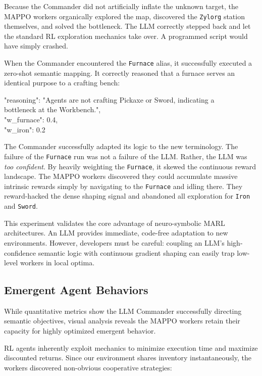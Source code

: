 Because the Commander did not artificially inflate the unknown target, the MAPPO workers organically explored the map, discovered the \texttt{Zylorg} station themselves, and solved the bottleneck. The LLM correctly stepped back and let the standard RL exploration mechanics take over. A programmed script would have simply crashed. 

When the Commander encountered the \texttt{Furnace} alias, it successfully executed a zero-shot semantic mapping. It correctly reasoned that a furnace serves an identical purpose to a crafting bench:
 
 \begin{hegquote}
 \ttfamily
 "reasoning": "Agents are not crafting Pickaxe or Sword, indicating a \\
 bottleneck at the Workbench.",\\
 "w\_furnace": 0.4,\\
 "w\_iron": 0.2
 \end{hegquote}
 
The Commander successfully adapted its logic to the new terminology. The failure of the \texttt{Furnace} run was not a failure of the LLM. Rather, the LLM was \emph{too confident}. By heavily weighting the \texttt{Furnace}, it skewed the continuous reward landscape. The MAPPO workers discovered they could accumulate massive intrinsic rewards simply by navigating to the \texttt{Furnace} and idling there. They reward-hacked the dense shaping signal and abandoned all exploration for \texttt{Iron} and \texttt{Sword}.

This experiment validates the core advantage of neuro-symbolic MARL architectures. An LLM provides immediate, code-free adaptation to new environments. However, developers must be careful: coupling an LLM's high-confidence semantic logic with continuous gradient shaping can easily trap low-level workers in local optima.

\subsection{Emergent Agent Behaviors}
\label{sec:emergent_behaviors}

While quantitative metrics show the LLM Commander successfully directing semantic objectives, visual analysis reveals the MAPPO workers retain their capacity for highly optimized emergent behavior. 

RL agents inherently exploit mechanics to minimize execution time and maximize discounted returns. Since our environment shares inventory instantaneously, the workers discovered non-obvious cooperative strategies:

